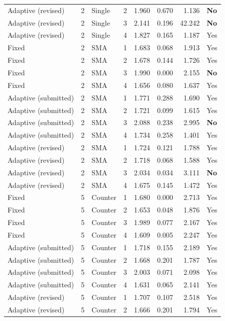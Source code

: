 {\begin{longtable}{lllrrrrl}
Adaptive (revised) & 2 & Single & 2 & 1.960 & 0.670 & 1.136 & \textbf{No}\\
Adaptive (revised) & 2 & Single & 3 & 2.141 & 0.196 & 42.242 & \textbf{No}\\
Adaptive (revised) & 2 & Single & 4 & 1.827 & 0.165 & 1.187 & Yes\\
Fixed & 2 & SMA & 1 & 1.683 & 0.068 & 1.913 & Yes\\
Fixed & 2 & SMA & 2 & 1.678 & 0.144 & 1.726 & Yes\\
Fixed & 2 & SMA & 3 & 1.990 & 0.000 & 2.155 & \textbf{No}\\
Fixed & 2 & SMA & 4 & 1.656 & 0.080 & 1.637 & Yes\\
Adaptive (submitted) & 2 & SMA & 1 & 1.771 & 0.288 & 1.690 & Yes\\
Adaptive (submitted) & 2 & SMA & 2 & 1.721 & 0.099 & 1.615 & Yes\\
Adaptive (submitted) & 2 & SMA & 3 & 2.088 & 0.238 & 2.995 & \textbf{No}\\
Adaptive (submitted) & 2 & SMA & 4 & 1.734 & 0.258 & 1.401 & Yes\\
Adaptive (revised) & 2 & SMA & 1 & 1.724 & 0.121 & 1.788 & Yes\\
Adaptive (revised) & 2 & SMA & 2 & 1.718 & 0.068 & 1.588 & Yes\\
Adaptive (revised) & 2 & SMA & 3 & 2.034 & 0.034 & 3.111 & \textbf{No}\\
Adaptive (revised) & 2 & SMA & 4 & 1.675 & 0.145 & 1.472 & Yes\\
Fixed & 5 & Counter & 1 & 1.680 & 0.000 & 2.713 & Yes\\
Fixed & 5 & Counter & 2 & 1.653 & 0.048 & 1.876 & Yes\\
Fixed & 5 & Counter & 3 & 1.989 & 0.077 & 2.167 & Yes\\
Fixed & 5 & Counter & 4 & 1.609 & 0.005 & 2.247 & Yes\\
Adaptive (submitted) & 5 & Counter & 1 & 1.718 & 0.155 & 2.189 & Yes\\
Adaptive (submitted) & 5 & Counter & 2 & 1.668 & 0.201 & 1.787 & Yes\\
Adaptive (submitted) & 5 & Counter & 3 & 2.003 & 0.071 & 2.098 & Yes\\
Adaptive (submitted) & 5 & Counter & 4 & 1.631 & 0.065 & 2.141 & Yes\\
Adaptive (revised) & 5 & Counter & 1 & 1.707 & 0.107 & 2.518 & Yes\\
Adaptive (revised) & 5 & Counter & 2 & 1.666 & 0.201 & 1.794 & Yes\\

\end{longtable}}
